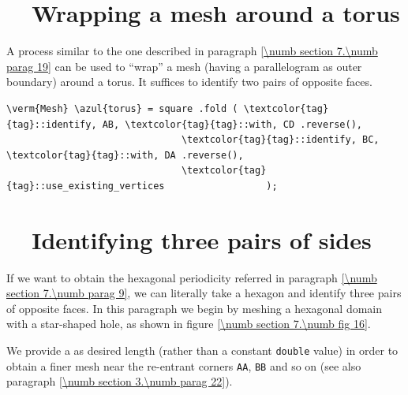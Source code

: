\section{~~Wrapping a mesh around a torus}\label{\numb section 7.\numb parag 20}

A process similar to the one described in paragraph \ref{\numb section 7.\numb parag 19}
can be used to ``wrap'' a mesh (having a parallelogram as outer boundary) around
a torus.
It suffices to identify two pairs of opposite faces.
\vskip 5mm

\begin{Verbatim}[commandchars=\\\{\},formatcom=\small\tt,frame=single,
   label=parag-\ref{\numb section 7.\numb parag 20}.cpp,rulecolor=\color{moldura},
   baselinestretch=0.94,framesep=2mm                                             ]
   \verm{Mesh} \azul{torus} = square .fold ( \textcolor{tag}{tag}::identify, AB, \textcolor{tag}{tag}::with, CD .reverse(),
                               \textcolor{tag}{tag}::identify, BC, \textcolor{tag}{tag}::with, DA .reverse(),
                               \textcolor{tag}{tag}::use_existing_vertices                  );
\end{Verbatim}


\section{~~Identifying three pairs of sides}\label{\numb section 7.\numb parag 21}

If we want to obtain the hexagonal periodicity referred in paragraph
\ref{\numb section 7.\numb parag 9}, we can literally take a hexagon and
identify three pairs of opposite faces.
In this paragraph we begin by meshing a hexagonal domain with a star-shaped hole,
as shown in figure \ref{\numb section 7.\numb fig 16}.

We provide a {\small\tt{}} as desired length
(rather than a constant {\small\tt double} value) in order to obtain a finer mesh near the
re-entrant corners {\small\tt AA}, {\small\tt BB} and so on
(see also paragraph \ref{\numb section 3.\numb parag 22}).

